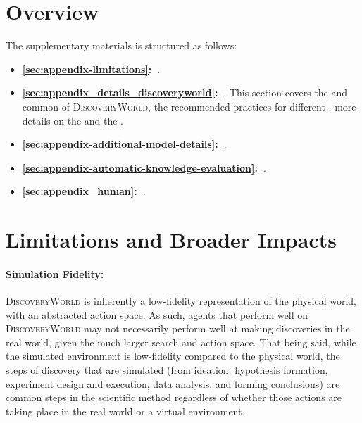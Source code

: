 \documentclass{article}
\newcommand{\env}{\textsc{DiscoveryWorld}\xspace}
\begin{document}
\clearpage
\appendix


\section{Overview}
The supplementary materials is structured as follows:
\begin{itemize}
    \item \textbf{\autoref{sec:appendix-limitations}:~}.
    \item \textbf{\autoref{sec:appendix_details_discoveryworld}:~}. This section covers the \textit{} and common \textit{} of \env, the recommended practices for different \textit{}, more details on the \textit{} and the \textit{}.
    
    \item \textbf{\autoref{sec:appendix-additional-model-details}:~}.

    \item \textbf{\autoref{sec:appendix-automatic-knowledge-evaluation}:~}.

    \item \textbf{\autoref{sec:appendix_human}:~}.
\end{itemize}

\clearpage

\section{Limitations and Broader Impacts}
\label{sec:appendix-limitations}

\paragraph{Simulation Fidelity:} \env is inherently a low-fidelity representation of the physical world, with an abstracted action space.  As such, agents that perform well on \env may not necessarily perform well at making discoveries in the real world, given the much larger search and action space.  That being said, while the simulated environment is low-fidelity compared to the physical world, the steps of discovery that are simulated (from ideation, hypothesis formation, experiment design and execution, data analysis, and forming conclusions) are common steps in the scientific method regardless of whether those actions are taking place in the real world or a virtual environment. 
\end{document}
